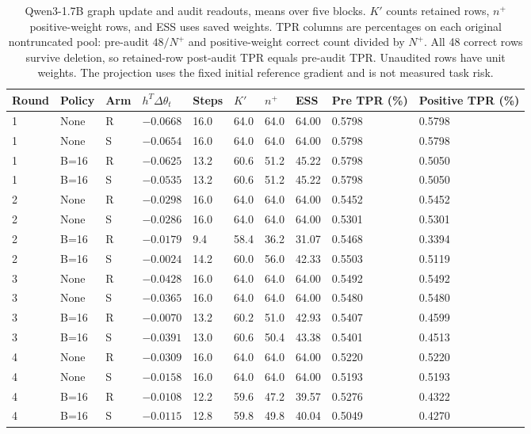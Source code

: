 \begin{table}[H]
\caption{Qwen3-1.7B graph update and audit readouts, means over five blocks. $K\prime$ counts retained rows, $n^+$ positive-weight rows, and ESS uses saved weights. TPR columns are percentages on each original nontruncated pool: pre-audit $48/N^+$ and positive-weight correct count divided by $N^+$. All 48 correct rows survive deletion, so retained-row post-audit TPR equals pre-audit TPR. Unaudited rows have unit weights. The projection uses the fixed initial reference gradient and is not measured task risk.}
\label{tab:qwen-audit}
\centering\small\setlength{\tabcolsep}{3pt}
\begin{tabular}{@{}llllllllll@{}}
\toprule
Round & Policy & Arm & $h^T\Delta\theta_t$ & Steps & $K\prime$ & $n^+$ & ESS & Pre TPR (\%) & Positive TPR (\%)\\
\midrule
1 & None & R & $-0.0668$ & 16.0 & 64.0 & 64.0 & 64.00 & 0.5798 & 0.5798\\
1 & None & S & $-0.0654$ & 16.0 & 64.0 & 64.0 & 64.00 & 0.5798 & 0.5798\\
1 & B=16 & R & $-0.0625$ & 13.2 & 60.6 & 51.2 & 45.22 & 0.5798 & 0.5050\\
1 & B=16 & S & $-0.0535$ & 13.2 & 60.6 & 51.2 & 45.22 & 0.5798 & 0.5050\\
2 & None & R & $-0.0298$ & 16.0 & 64.0 & 64.0 & 64.00 & 0.5452 & 0.5452\\
2 & None & S & $-0.0286$ & 16.0 & 64.0 & 64.0 & 64.00 & 0.5301 & 0.5301\\
2 & B=16 & R & $-0.0179$ & 9.4 & 58.4 & 36.2 & 31.07 & 0.5468 & 0.3394\\
2 & B=16 & S & $-0.0024$ & 14.2 & 60.0 & 56.0 & 42.33 & 0.5503 & 0.5119\\
3 & None & R & $-0.0428$ & 16.0 & 64.0 & 64.0 & 64.00 & 0.5492 & 0.5492\\
3 & None & S & $-0.0365$ & 16.0 & 64.0 & 64.0 & 64.00 & 0.5480 & 0.5480\\
3 & B=16 & R & $-0.0070$ & 13.2 & 60.2 & 51.0 & 42.93 & 0.5407 & 0.4599\\
3 & B=16 & S & $-0.0391$ & 13.0 & 60.6 & 50.4 & 43.38 & 0.5401 & 0.4513\\
4 & None & R & $-0.0309$ & 16.0 & 64.0 & 64.0 & 64.00 & 0.5220 & 0.5220\\
4 & None & S & $-0.0158$ & 16.0 & 64.0 & 64.0 & 64.00 & 0.5193 & 0.5193\\
4 & B=16 & R & $-0.0108$ & 12.2 & 59.6 & 47.2 & 39.57 & 0.5276 & 0.4322\\
4 & B=16 & S & $-0.0115$ & 12.8 & 59.8 & 49.8 & 40.04 & 0.5049 & 0.4270\\
\bottomrule
\end{tabular}
\end{table}
